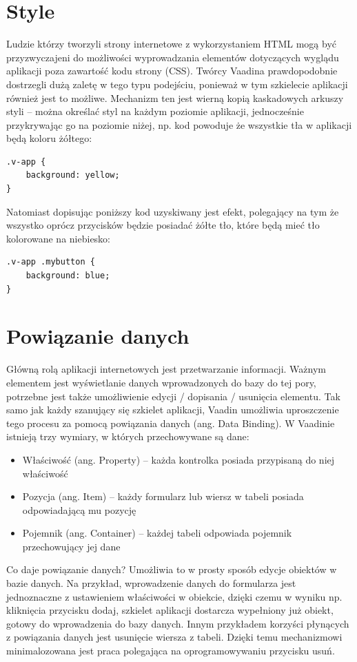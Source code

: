 \newpage
\section{Style}
Ludzie którzy tworzyli strony internetowe z wykorzystaniem HTML mogą być przyzwyczajeni do możliwości wyprowadzania elementów dotyczących wyglądu aplikacji poza zawartość kodu strony (CSS). Twórcy Vaadina prawdopodobnie dostrzegli dużą zaletę w tego typu podejściu, ponieważ w tym szkielecie aplikacji również jest to możliwe. Mechanizm ten jest wierną kopią kaskadowych arkuszy styli – można określać styl na każdym poziomie aplikacji, jednocześnie przykrywając go na poziomie niżej, np. kod powoduje że wszystkie tła w aplikacji będą koloru żółtego:
\begin{lstlisting}
.v-app {
	background: yellow;
}
\end{lstlisting}
Natomiast dopisując poniższy kod uzyskiwany jest efekt, polegający na tym że wszystko oprócz przycisków będzie posiadać żółte tło, które będą mieć tło kolorowane na niebiesko:
\begin{lstlisting}
.v-app .mybutton {
	background: blue;
}
\end{lstlisting}
\section{Powiązanie danych}
Główną rolą aplikacji internetowych jest przetwarzanie informacji. Ważnym elementem jest wyświetlanie danych wprowadzonych do bazy do tej pory, potrzebne jest także umożliwienie edycji / dopisania / usunięcia elementu. Tak samo jak każdy szanujący się szkielet aplikacji, Vaadin umożliwia uproszczenie tego procesu za pomocą powiązania danych (ang. Data Binding). W Vaadinie istnieją trzy wymiary, w których przechowywane są dane:
\begin{itemize}
\item Właściwość (ang. Property) – każda kontrolka posiada przypisaną do niej właściwość
\item Pozycja (ang. Item) – każdy formularz lub wiersz w tabeli posiada odpowiadającą mu pozycję
\item Pojemnik (ang. Container) – każdej tabeli odpowiada pojemnik przechowujący jej dane
\end{itemize}

Co daje powiązanie danych? Umożliwia to w prosty sposób edycje obiektów w bazie danych. Na przykład, wprowadzenie danych do formularza jest jednoznaczne z ustawieniem właściwości w obiekcie, dzięki czemu w wyniku np. kliknięcia przycisku dodaj, szkielet aplikacji dostarcza wypełniony już obiekt, gotowy do wprowadzenia do bazy danych. 
\newpage
Innym przykładem korzyści płynących z powiązania danych jest usunięcie wiersza z tabeli. Dzięki temu mechanizmowi minimalozowana jest praca polegająca na oprogramowywaniu przycisku usuń.


